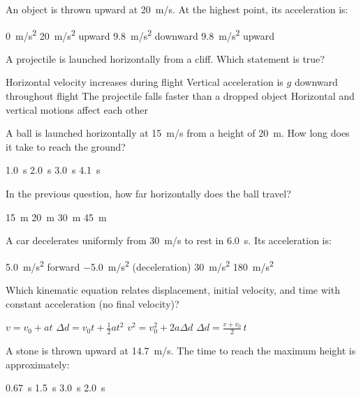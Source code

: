 \documentclass[addpoints]{exam}
\begin{document}
\begin{questions}
\question[1] An object is thrown upward at \SI{20}{m/s}. At the highest point, its
acceleration is:
\begin{choices}
    \choice \SI{0}{m/s^2}
    \choice \SI{20}{m/s^2} upward
    \correctchoice \SI{9.8}{m/s^2} downward
    \choice \SI{9.8}{m/s^2} upward
\end{choices}

\question[1] A projectile is launched horizontally from a cliff. Which statement is true?
\begin{choices}
    \choice Horizontal velocity increases during flight
    \correctchoice Vertical acceleration is $g$ downward throughout flight
    \choice The projectile falls faster than a dropped object
    \choice Horizontal and vertical motions affect each other
\end{choices}

\question[1] A ball is launched horizontally at \SI{15}{m/s} from a height of
\SI{20}{m}. How long does it take to reach the ground?
\begin{choices}
    \choice \SI{1.0}{s}
    \correctchoice \SI{2.0}{s}
    \choice \SI{3.0}{s}
    \choice \SI{4.1}{s}
\end{choices}

\question[1] In the previous question, how far horizontally does the ball travel?
\begin{choices}
    \choice \SI{15}{m}
    \choice \SI{20}{m}
    \correctchoice \SI{30}{m}
    \choice \SI{45}{m}
\end{choices}

\question[1] A car decelerates uniformly from \SI{30}{m/s} to rest in \SI{6.0}{s}.
Its acceleration is:
\begin{choices}
    \choice \SI{5.0}{m/s^2} forward
    \correctchoice \SI{-5.0}{m/s^2} (deceleration)
    \choice \SI{30}{m/s^2}
    \choice \SI{180}{m/s^2}
\end{choices}

\question[1] Which kinematic equation relates displacement, initial velocity, and
time with constant acceleration (no final velocity)?
\begin{choices}
    \choice $v = v_0 + at$
    \correctchoice $\Delta d = v_0 t + \tfrac{1}{2}at^2$
    \choice $v^2 = v_0^2 + 2a\Delta d$
    \choice $\Delta d = \tfrac{v+v_0}{2}\,t$
\end{choices}

\question[1] A stone is thrown upward at \SI{14.7}{m/s}. The time to reach the maximum
height is approximately:
\begin{choices}
    \choice \SI{0.67}{s}
    \correctchoice \SI{1.5}{s}
    \choice \SI{3.0}{s}
    \choice \SI{2.0}{s}
\end{choices}


\end{questions}
\end{document}

